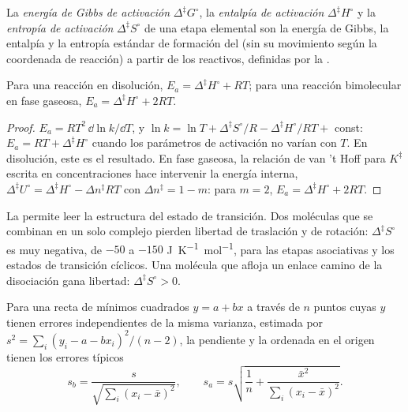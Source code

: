 \begin{definition}\label{def:b3:rate-theories:activation}
La \emph{energía de Gibbs de activación}
$\Delta^{\ddagger}G^\circ$, la \emph{entalpía de activación} $\Delta^{\ddagger}H^\circ$ y la
\emph{entropía de activación} $\Delta^{\ddagger}S^\circ$ de una etapa elemental
son la energía de Gibbs, la entalpía y la entropía estándar de formación del
 (sin su movimiento según la coordenada de reacción) a partir de los reactivos,
definidas por la .
\end{definition}

\begin{proposition}\label{prop:b3:rate-theories:ea-dh}
Para una reacción en disolución, $E_a = \Delta^{\ddagger}H^\circ + RT$; para una reacción bimolecular en fase gaseosa,
$E_a = \Delta^{\ddagger}H^\circ + 2RT$.
\end{proposition}

\begin{proof}
$E_a = RT^2\,\dd\ln k/\dd T$, y $\ln k = \ln T + \Delta^{\ddagger}S^\circ/R - \Delta^{\ddagger}H^\circ/RT + $ const: $E_a =
RT + \Delta^{\ddagger}H^\circ$ cuando los parámetros de activación no varían con $T$. En disolución,
este es el resultado. En fase gaseosa, la relación de van 't Hoff para $K^{\ddagger}$ escrita
en concentraciones hace intervenir la energía interna, $\Delta^{\ddagger}U^\circ = \Delta^{\ddagger}H^\circ - \Delta n^{\ddagger}RT$
con $\Delta n^{\ddagger} = 1 - m$: para $m = 2$, $E_a = \Delta^{\ddagger}H^\circ + 2RT$.
\end{proof}

La  permite leer la estructura del estado de transición. Dos
moléculas que se combinan en un solo complejo pierden libertad de traslación y de
rotación: $\Delta^{\ddagger}S^\circ$ es muy negativa, de $-50$ a $-150$ \unit{J.K^{-1}.mol^{-1}}, para las
etapas asociativas y los estados de transición cíclicos. Una molécula que afloja un enlace
camino de la disociación gana libertad: $\Delta^{\ddagger}S^\circ > 0$.

\begin{proposition}\label{prop:b3:rate-theories:slope-uncertainty}
Para una recta de mínimos cuadrados $y = a + bx$ a través de $n$ puntos cuyas $y$ tienen
errores independientes de la misma varianza, estimada por $s^2 = \sum_i(y_i - a - bx_i)^2/(n - 2)$,
la pendiente y la ordenada en el origen tienen los errores típicos
\[
  s_b = \frac{s}{\sqrt{\sum_i(x_i - \bar x)^2}}, \qquad
  s_a = s\sqrt{\frac1n + \frac{\bar x^2}{\sum_i(x_i - \bar x)^2}} .
\]
\end{proposition}

